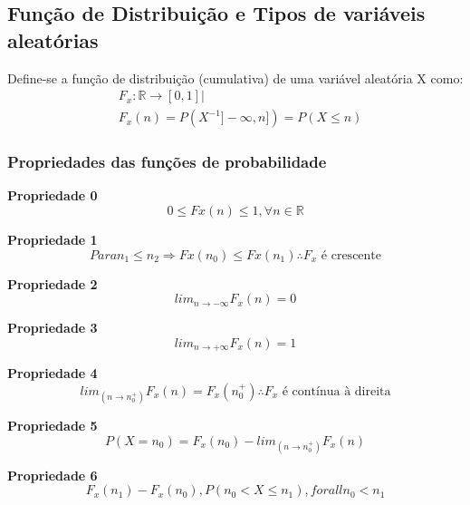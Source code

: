 \documentclass[a4paper,12pt]{article}
\begin{document}
	\subsection{Função de Distribuição e Tipos de variáveis aleatórias}
		Define-se a função de distribuição (cumulativa) de uma variável aleatória X como:
		\begin{equation}
			\begin{split}
				& F_x: \mathbb{R} \longrightarrow [0,1] | \\
				& F_x(n)=P(X^{-1} ]-\infty, n]) =P(X \leq n)	
			\end{split}
		\end{equation}
		\subsubsection{Propriedades das funções de probabilidade}
			\begin{center}
				\bfseries{Propriedade 0}
				\begin{equation}
					0 \leq Fx(n) \leq 1, \forall n \in \mathbb{R}
				\end{equation}

				\bfseries{Propriedade 1}
				\begin{equation}
					Para n_1 \leq n_2 \Longrightarrow Fx(n_0) \leq Fx(n_1) \therefore F_x \text{ é crescente}
				\end{equation}

				\bfseries{Propriedade 2}
				\begin{equation}
					lim_{n \rightarrow -\infty} F_x(n)=0 
				\end{equation}

				\bfseries{Propriedade 3}
				\begin{equation}
					lim_{n \rightarrow +\infty} F_x(n)=1 
				\end{equation}

				\bfseries{Propriedade 4}
				\begin{equation}
					lim_(n \rightarrow n_0^+) F_x(n) = F_x(n_0^+) \therefore F_x \text{ é contínua à direita}
				\end{equation}

				\bfseries{Propriedade 5}
				\begin{equation}
					P(X=n_0)= F_x(n_0) - lim_(n \rightarrow n_0^+) F_x(n) 
				\end{equation}
	
				\bfseries{Propriedade 6}
				\begin{equation}
					F_x(n_1)-F_x(n_0), P(n_0 < X \leq n_1), forall n_0 < n_1
				\end{equation}
		\end{center}
		\cleanpage
\end{document}
